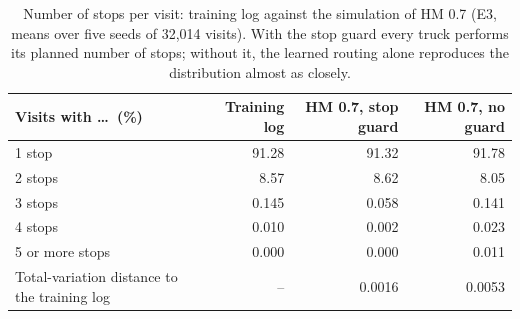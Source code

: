 \begin{table}[htbp]
\centering
\small
\begin{tabular}{lrrr}
\toprule
\textbf{Visits with \ldots\ (\%)} & \textbf{Training log} & \textbf{HM 0.7, stop guard} & \textbf{HM 0.7, no guard} \\
\midrule
1 stop & 91.28 & 91.32 & 91.78 \\
2 stops & 8.57 & 8.62 & 8.05 \\
3 stops & 0.145 & 0.058 & 0.141 \\
4 stops & 0.010 & 0.002 & 0.023 \\
5 or more stops & 0.000 & 0.000 & 0.011 \\
\midrule
Total-variation distance to the training log & -- & 0.0016 & 0.0053 \\
\bottomrule
\end{tabular}
\caption{Number of stops per visit: training log against the simulation of HM 0.7 (E3, means over five seeds of 32,014 visits). With the stop guard every truck performs its planned number of stops; without it, the learned routing alone reproduces the distribution almost as closely.}
\label{tab:rq1_e3_stopcount}
\end{table}
